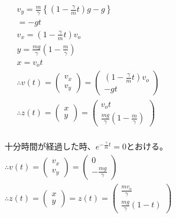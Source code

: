\documentclass[dvipdfmx,uplatex]{jsarticle}
\begin{document}
  \begin{equation}
    \begin{aligned}
      &{v}_{y} = \frac{m}{\gamma} \left\{ \left( 1-\frac{\gamma}{m}t \right)g - g \right\}\nonumber\\
      &= -gt\nonumber\\
      &{v}_{x} = \left( 1-\frac{\gamma}{m}t \right){v}_{o}\nonumber\\
      &y=\frac{mg}{\gamma}\left( 1- \frac{m}{\gamma} \right)\nonumber\\
      &x={v}_{o}t\nonumber\\
      &\therefore v(t)=\begin{pmatrix} {v}_{x} \\ {v}_{y} \end{pmatrix} = \begin{pmatrix} \left( 1-\frac{\gamma}{m}t \right){v}_{o} \\ -gt \end{pmatrix}\nonumber\\
      &\therefore z(t)=\begin{pmatrix} x \\ y \end{pmatrix} = \begin{pmatrix} {v}_{o}t \\ \frac{mg}{\gamma}\left( 1- \frac{m}{\gamma} \right) \end{pmatrix}\nonumber\\
    \end{aligned}
  \end{equation}

  \begin{equation}
    \begin{aligned}
      &十分時間が経過した時、e^{-\frac{\gamma}{m}t} = 0 とおける。\nonumber\\
      &\therefore v(t)=\begin{pmatrix} {v}_{x} \\ {v}_{y} \end{pmatrix} = \begin{pmatrix} 0 \\ -\frac{mg}{\gamma} \end{pmatrix}\nonumber\\
      &\therefore z(t)=\begin{pmatrix} x \\ y \end{pmatrix} = z(t)=\begin{pmatrix} \frac{m{v}_{o}}{\gamma} \\ \frac{mg}{\gamma}(1-t) \end{pmatrix}
    \end{aligned}
  \end{equation}
\end{document}
